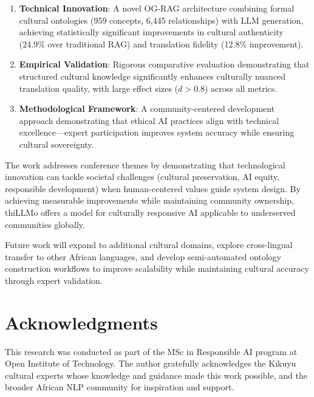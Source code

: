 \documentclass[a4paper,11pt]{article}
\begin{document}
\begin{enumerate}
    \item \textbf{Technical Innovation}: A novel OG-RAG architecture combining formal cultural ontologies (959 concepts, 6,445 relationships) with LLM generation, achieving statistically significant improvements in cultural authenticity (24.9\% over traditional RAG) and translation fidelity (12.8\% improvement).
    
    \item \textbf{Empirical Validation}: Rigorous comparative evaluation demonstrating that structured cultural knowledge significantly enhances culturally nuanced translation quality, with large effect sizes ($d > 0.8$) across all metrics.
    
    \item \textbf{Methodological Framework}: A community-centered development approach demonstrating that ethical AI practices align with technical excellence—expert participation improves system accuracy while ensuring cultural sovereignty.
\end{enumerate}

The work addresses conference themes by demonstrating that technological innovation can tackle societal challenges (cultural preservation, AI equity, responsible development) when human-centered values guide system design. By achieving measurable improvements while maintaining community ownership, thiLLMo offers a model for culturally responsive AI applicable to underserved communities globally.

Future work will expand to additional cultural domains, explore cross-lingual transfer to other African languages, and develop semi-automated ontology construction workflows to improve scalability while maintaining cultural accuracy through expert validation.

\section*{Acknowledgments}

This research was conducted as part of the MSc in Responsible AI program at Open Institute of Technology. The author gratefully acknowledges the Kikuyu cultural experts whose knowledge and guidance made this work possible, and the broader African NLP community for inspiration and support.
\end{document}
